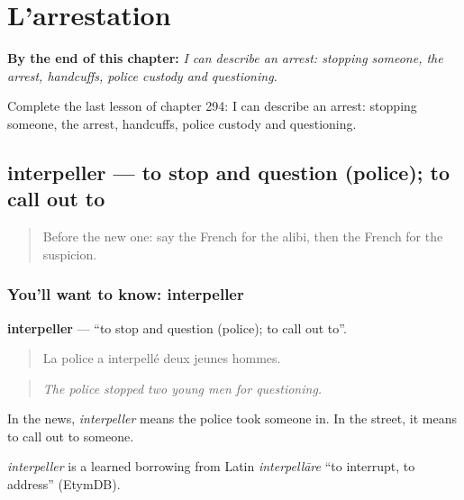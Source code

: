 
\chapter{L'arrestation}
\label{ch:fr-l-arrestation}

\begin{chapteropening}
\textbf{By the end of this chapter:} \emph{I can describe an arrest: stopping someone, the arrest, handcuffs, police custody and questioning.}

Complete the last lesson of chapter 294: I can describe an arrest: stopping someone, the arrest, handcuffs, police custody and questioning.
\end{chapteropening}

\section[interpeller]{interpeller — to stop and question (police); to call out to}

\label{lesson:FR-C294-interpeller}



\begin{quote}
Before the new one: say the French for the alibi, then the French for the suspicion.
\end{quote}

\subsection*{You'll want to know: interpeller}
\textbf{interpeller} — \textquotedblleft{}to stop and question (police); to call out to\textquotedblright{}.

\begin{quote}
La police a interpellé deux jeunes hommes.
\end{quote}

\begin{quote}
\emph{The police stopped two young men for questioning.}
\end{quote}

In the news, \emph{interpeller} means the police took someone in. In the street, it means to call out to someone.

\begin{cousinweb}
\emph{interpeller} is a learned borrowing from Latin \emph{interpellāre} \textquotedblleft{}to interrupt, to address\textquotedblright{} (EtymDB).
\end{cousinweb}

